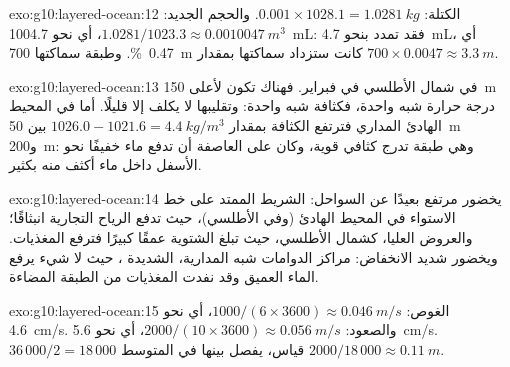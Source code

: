 \begin{solution}{exo:g10:layered-ocean:12}
الكتلة: $0.001 \times 1028.1 = \qty{1.0281}{kg}$. والحجم الجديد: $1.0281/1023.3
\approx \qty{0.0010047}{m^3}$، أي نحو \qty{1004.7}{mL}: فقد تمدد بنحو
\qty{4.7}{mL}، أي \qty{0.47}{\percent}. وطبقة سماكتها \qty{700}{m} كانت ستزداد
سماكتها بمقدار $700 \times 0.0047 \approx \qty{3.3}{m}$.
\end{solution}

\begin{solution}{exo:g10:layered-ocean:13}
في شمال الأطلسي في فبراير. فهناك تكون لأعلى \qty{150}{m} درجة حرارة شبه واحدة،
فكثافة شبه واحدة: وتقليبها لا يكلف إلا قليلًا. أما في المحيط الهادئ المداري فترتفع
الكثافة بمقدار $1026.0 - 1021.6 =
\qty{4.4}{kg/m^3}$ بين \qty{50}{m} و\qty{200}{m}: وهي طبقة تدرج كثافي قوية،
وكان على العاصفة أن تدفع ماء خفيفًا نحو الأسفل داخل ماء أكثف منه بكثير.
\end{solution}

\begin{solution}{exo:g10:layered-ocean:14}
يخضور مرتفع بعيدًا عن السواحل: الشريط الممتد على خط الاستواء في المحيط الهادئ
(وفي الأطلسي)، حيث تدفع الرياح التجارية انبثاقًا؛ والعروض العليا، كشمال الأطلسي،
حيث تبلغ  الشتوية عمقًا كبيرًا فترفع المغذيات. ويخضور شديد الانخفاض:
مراكز الدوامات شبه المدارية، الشديدة ، حيث لا شيء يرفع الماء العميق وقد
نفدت المغذيات من الطبقة المضاءة.
\end{solution}

\begin{solution}{exo:g10:layered-ocean:15}
الغوص: $1000/(6 \times 3600) \approx \qty{0.046}{m/s}$، أي نحو
\qty{4.6}{cm/s}. والصعود: $2000/(10 \times 3600) \approx \qty{0.056}{m/s}$،
أي نحو \qty{5.6}{cm/s}. $36\,000/2 = 18\,000$ قياس، يفصل بينها في المتوسط
$2000/18\,000 \approx \qty{0.11}{m}$.
\end{solution}


